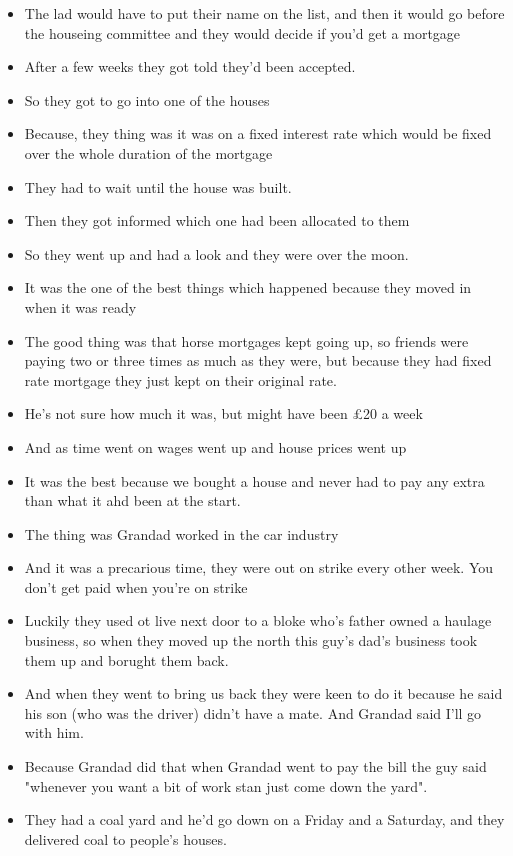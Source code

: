 \documentclass[10pt,twocolumn,letterpaper]{article}
\begin{document}
\begin{itemize}
    \item The lad would have to put their name on the list, and then it would go before the houseing committee and they would decide if you'd get a mortgage
    \item After a few weeks they got told they'd been accepted.
    \item So they got to go into one of the houses
    \item Because, they thing was it was on a fixed interest rate which would be fixed over the whole duration of the mortgage
    \item They had to wait until the house was built.
    \item Then they got informed which one had been allocated to them
    \item So they went up and had a look and they were over the moon.
    \item It was the one of the best things which happened because they moved in when it was ready
    \item The good thing was that horse mortgages kept going up, so friends were paying two or three times as much as they were, but because they had fixed rate mortgage they just kept on their original rate.
    \item He's not sure how much it was, but might have been £20 a week
    \item And as time went on wages went up and house prices went up
    \item It was the best because we bought a house and never had to pay any extra than what it ahd been at the start.
    \item The thing was Grandad worked in the car industry
    \item And it was a precarious time, they were out on strike every other week. You don't get paid when you're on strike
    \item Luckily they used ot live next door to a bloke who's father owned a haulage business, so when they moved up the north this guy's dad's business took them up and borught them back.
    \item And when they went to bring us back they were keen to do it because he said his son (who was the driver) didn't have a mate. And Grandad said I'll go with him.
    \item Because Grandad did that when Grandad went to pay the bill the guy said "whenever you  want a bit of work stan just come down the yard".
    \item They had a coal yard and he'd go down on a Friday and a Saturday, and they delivered coal to people's houses.

\end{itemize}
\end{document}
